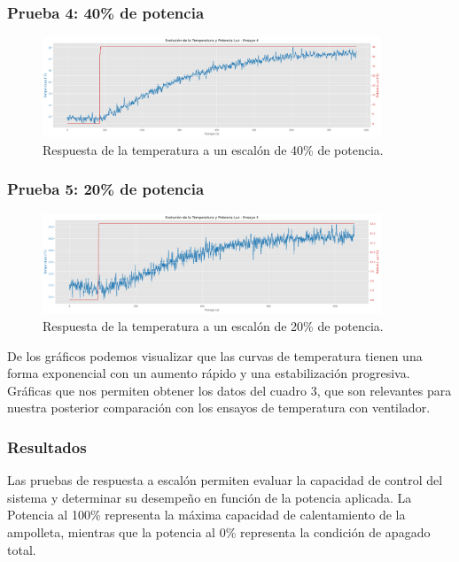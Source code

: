\documentclass[spanish, a4paper, 11pt]{article}
\begin{document}
\subsubsection{Prueba 4: 40\% de potencia}

\begin{figure}[ht]
    \centering
    \includegraphics[width=0.9\textwidth]{./figures/prueba4.png}
    \caption{Respuesta de la temperatura a un escalón de 40\% de potencia.}
\end{figure}
\FloatBarrier

\newpage
\subsubsection{Prueba 5: 20\% de potencia}

\begin{figure}[ht]
    \centering
    \includegraphics[width=0.9\textwidth]{./figures/prueba5.png}
    \caption{Respuesta de la temperatura a un escalón de 20\% de potencia.}
\end{figure}
\FloatBarrier

De los gráficos podemos visualizar que las curvas de temperatura tienen una forma exponencial con un aumento rápido y una estabilización progresiva. Gráficas que nos permiten obtener los datos del cuadro 3, que son relevantes para nuestra posterior comparación con los ensayos de temperatura con ventilador.


\subsubsection{Resultados}

Las pruebas de respuesta a escalón permiten evaluar la capacidad de control del sistema y determinar su desempeño en función de la potencia aplicada. La Potencia al 100\% representa la máxima capacidad de calentamiento de la ampolleta, mientras que la potencia al 0\% representa la condición de apagado total. 
\end{document}
